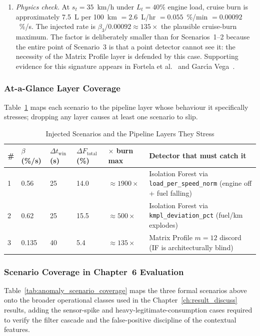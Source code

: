 \begin{enumerate}[label=\textbf{(\alph*)}, leftmargin=*]
    \item \textit{Physics check.} At $s_t = 35$~km/h under $L_t = 40\%$ engine load, cruise burn is approximately 7.5~L per 100~km $= 2.6$~L/hr $= 0.055$~\%/min $= 0.00092$~\%/s. The injected rate is $\beta_3 / 0.00092 \approx 135\times$ the plausible cruise-burn maximum. The factor is deliberately smaller than for Scenarios~1--2 because the entire point of Scenario~3 is that a point detector cannot see it: the necessity of the Matrix Profile layer is defended by this case. Supporting evidence for this signature appears in Fortela et al.~\cite{fortela2023unsupervised} and Garc\'{\i}a Vega~\cite{garcia2022development}.
\end{enumerate}

\subsubsection{At-a-Glance Layer Coverage}

Table~\ref{tab:injection_layer_coverage} maps each scenario to the pipeline layer whose behaviour it specifically stresses; dropping any layer causes at least one scenario to slip.

\begin{table}[!htbp]
\centering
\caption{Injected Scenarios and the Pipeline Layers They Stress}
\label{tab:injection_layer_coverage}
\scriptsize
\begin{tabular}{|p{}|p{}|p{}|p{}|p{}|p{}|}
\hline
\textbf{\#} & $\beta$ (\%/s) & $\Delta t_{\mathrm{win}}$ (s) & $\Delta F_{\mathrm{total}}$ (\%) & \textbf{$\times$ burn max} & \textbf{Detector that must catch it} \\
\hline
1 & 0.56 & 25 & 14.0 & $\approx 1900\times$ & Isolation Forest via \texttt{load\_per\_speed\_norm} (engine off + fuel falling) \\
\hline
2 & 0.62 & 25 & 15.5 & $\approx 500\times$ & Isolation Forest via \texttt{kmpl\_deviation\_pct} (fuel/km explodes) \\
\hline
3 & 0.135 & 40 & 5.4 & $\approx 135\times$ & Matrix Profile $m = 12$ discord (IF is architecturally blind) \\
\hline
\end{tabular}
\normalsize
\end{table}

\subsubsection{Scenario Coverage in Chapter~6 Evaluation}
Table~\ref{tab:anomaly_scenario_coverage} maps the three formal scenarios above onto the broader operational classes used in the Chapter~\ref{ch:result_discuss} results, adding the sensor-spike and heavy-legitimate-consumption cases required to verify the filter cascade and the false-positive discipline of the contextual features.

